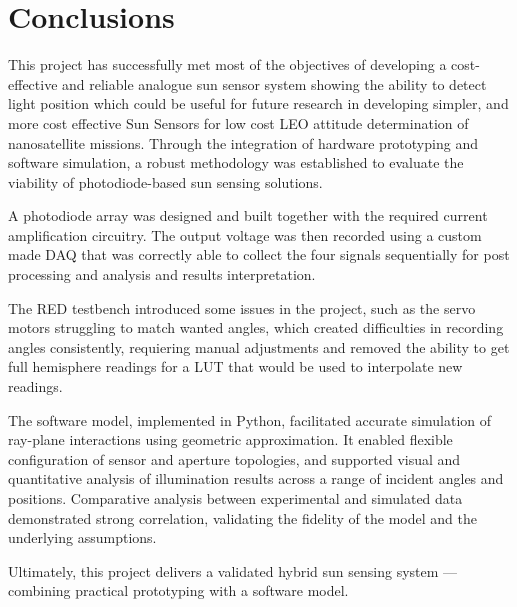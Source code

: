 \chapter{Conclusions}

This project has successfully met most of the objectives of developing a cost-effective and reliable analogue sun sensor system showing the ability to detect light position which could be useful for future research in developing simpler, and more cost effective Sun Sensors for low cost \acf{LEO} attitude determination of nanosatellite missions. Through the integration of hardware prototyping and software simulation, a robust methodology was established to evaluate the viability of photodiode-based sun sensing solutions.

A photodiode array was designed and built together with the required current amplification circuitry. The output voltage was then recorded using a custom made \ac{DAQ} that was correctly able to collect the four signals sequentially for post processing and analysis and results interpretation.


The \acf{RED} testbench introduced some issues in the project, such as the servo motors struggling to match wanted angles, which created difficulties in recording angles consistently, requiering manual adjustments and removed the ability to get full hemisphere readings for a \ac{LUT} that would be used to interpolate new readings.

The software model, implemented in Python, facilitated accurate simulation of ray-plane interactions using geometric approximation. It enabled flexible configuration of sensor and aperture topologies, and supported visual and quantitative analysis of illumination results across a range of incident angles and positions. Comparative analysis between experimental and simulated data demonstrated strong correlation, validating the fidelity of the model and the underlying assumptions.

Ultimately, this project delivers a validated hybrid sun sensing system — combining practical prototyping with a software model.
